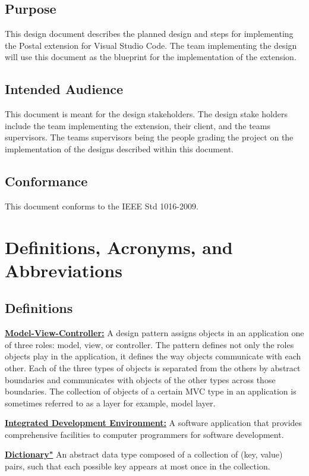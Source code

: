 \documentclass[letterpaper,10pt,titlepage,draftclsnofoot,onecolumn,onesided] {IEEEtran}
\begin{document}
\subsection{Purpose}
This design document describes the planned design and steps for implementing the Postal extension for Visual Studio Code. 
The team implementing the design will use this document as the blueprint for the implementation of the extension. 

\subsection{Intended Audience}
This document is meant for the design stakeholders. 
The design stake holders include the team implementing the extension, their client, and the teams supervisors. 
The teams supervisors being the people grading the project on the implementation of the designs described within this document.

\subsection{Conformance}
This document conforms to the IEEE Std 1016-2009.

\section{Definitions, Acronyms, and Abbreviations}

\subsection{Definitions}
\underline{\textbf{Model-View-Controller:}} A design pattern assigns objects in an application one of three roles: model, view, or controller. 
The pattern defines not only the roles objects play in the application, it defines the way objects communicate with each other. 
Each of the three types of objects is separated from the others by abstract boundaries and communicates with objects of the other types across those boundaries. 
The collection of objects of a certain MVC type in an application is sometimes referred to as a layer for example, model layer.\cite{appleMVC} 

\underline{\textbf{Integrated Development Environment:}} A software application that provides comprehensive facilities to computer programmers for software development. 

\underline{\textbf{Dictionary"}} An abstract data type composed of a collection of (key, value) pairs, such that each possible key appears at most once in the collection.
\end{document}
